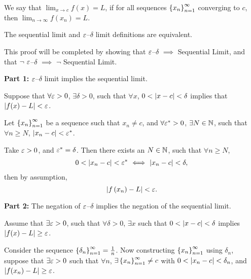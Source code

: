\documentclass[12pt]{article}
\theoremstyle{definition}
\renewenvironment{proof}[1][\proofname]{\vspace{-10pt}\begin{replacementproof}}{\end{replacementproof}}
\newcommand{\xn}{\set{x_{n}}_{n = 1}^{\infty}}
\newcommand{\ds}{\displaystyle}
\begin{document}
            \begin{definition}
                We say that $\ds\lim_{x \rightarrow c}f(x) = L$, if for all sequences $\xn$ converging to $c$, then $\ds\lim_{n \rightarrow \infty}f(x_{n}) = L$.
            \end{definition}
            \begin{prop}
                The sequential limit and $\varepsilon$--$\delta$ limit definitions are equivalent.
            \end{prop}
            \begin{proof}
                This proof will be completed by showing that $\varepsilon$--$\delta$ $\implies $ Sequential Limit, and that $\neg  ~\varepsilon$--$\delta$ $\implies$ $\neg$ Sequential Limit.

                \textbf{Part 1:} $\varepsilon$--$\delta$ limit implies the sequential limit.

                Suppose that $\forall \varepsilon > 0$, $\exists \delta > 0$, such that $\forall x$, $0 < \left|x - c\right| < \delta$ implies that $\left|f(x) - L\right| < \varepsilon$.

                Let $\xn$ be a sequence such that $x_{n} \neq c$, and $\forall \varepsilon^{\ast} > 0$, $\exists N \in \mathbb{N}$, such that $\forall n \geq N$, $\left|x_{n} - c\right| < \varepsilon^{\ast}$.

                Take $\varepsilon > 0$, and $\varepsilon^{\ast} = \delta$. Then there exists an $N \in \mathbb{N}$, such that $\forall n \geq N$, 
                \begin{align*}
                    0 < \left|x_{n} - c\right| < \varepsilon^{\ast} ~ \Longleftrightarrow ~ \left|x_{n} - c\right| < \delta,
                \end{align*}
                then by assumption,
                \begin{equation*}
                    \left|f\left(x_{n}\right) - L\right| < \varepsilon.
                \end{equation*}
                
                \textbf{Part 2:} The negation of $\varepsilon$--$\delta$ implies the negation of the sequential limit.

                Assume that $\exists \varepsilon > 0$, such that $\forall \delta > 0$, $\exists x$ such that $0 < \left|x - c\right| < \delta$ implies $\left|f(x) - L\right| \geq \varepsilon$.

                Consider the sequence $\left\{\delta_{n}\right\}_{n = 1}^{\infty} = \frac{1}{n}$. Now constructing $\xn$ using $\delta_{n}$, suppose that $\exists \varepsilon > 0$ such that $\forall n$, $\exists \xn \neq c$ with $0 < \left|x_{n} - c\right| < \delta_{n}$, and $\left|f(x_{n}) - L\right| \geq \varepsilon$.


\end{proof}
\end{document}
